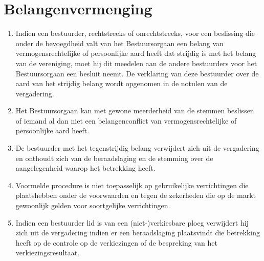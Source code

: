 \section{Belangenvermenging}
    \begin{enumerate}
        \item Indien een bestuurder, rechtstreeks of onrechtstreeks, voor een beslissing die onder de bevoegdheid valt van het Bestuursorgaan een belang van vermogensrechtelijke of persoonlijke aard heeft dat strijdig is met het belang van de vereniging, moet hij dit meedelen aan de andere bestuurders voor het Bestuursorgaan een besluit neemt. De verklaring van deze bestuurder over de aard van het strijdig belang wordt opgenomen in de notulen van de vergadering.
        \item Het Bestuursorgaan kan met gewone meerderheid van de stemmen beslissen of iemand al dan niet een belangenconflict van vermogensrechtelijke of persoonlijke aard heeft.
        \item De bestuurder met het tegenstrijdig belang verwijdert zich uit de vergadering en onthoudt zich van de beraadslaging en de stemming over de aangelegenheid waarop het betrekking heeft.
        \item Voormelde procedure is niet toepasselijk op gebruikelijke verrichtingen die plaatshebben onder de voorwaarden en tegen de zekerheden die op de markt gewoonlijk gelden voor soortgelijke verrichtingen.
        \item Indien een bestuurder lid is van een (niet-)verkiesbare ploeg verwijdert hij zich uit de vergadering indien er een beraadslaging plaatsvindt die betrekking heeft op de controle op de verkiezingen of de bespreking van het verkiezingsresultaat.
    \end{enumerate}


